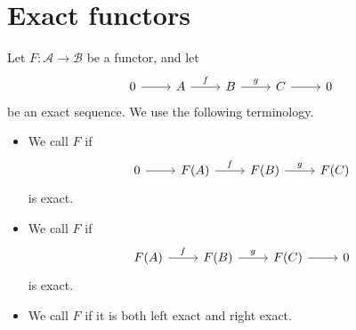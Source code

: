 \documentclass[main.tex]{subfiles}
\begin{document}
\section{Exact functors}
\label{sec:exact_functors}

\begin{definition}
  \label{def:exact_functor}
  Let $F\colon \mathcal{A} \to \mathcal{B}$ be a functor, and let
  \begin{equation*}
    \begin{tikzcd}
      0
      \arrow[r]
      & A
      \arrow[r, "f"]
      & B
      \arrow[r, "g"]
      & C
      \arrow[r]
      & 0
    \end{tikzcd}
  \end{equation*}
  be an exact sequence. We use the following terminology.
  \begin{itemize}
    \item We call $F$  if
      \begin{equation*}
        \begin{tikzcd}
          0
          \arrow[r]
          & F(A)
          \arrow[r, "f"]
          & F(B)
          \arrow[r, "g"]
          & F(C)
        \end{tikzcd}
      \end{equation*}
      is exact.

    \item We call $F$  if
      \begin{equation*}
        \begin{tikzcd}
          F(A)
          \arrow[r, "f"]
          & F(B)
          \arrow[r, "g"]
          & F(C)
          \arrow[r]
          & 0
        \end{tikzcd}
      \end{equation*}
      is exact.

    \item We call $F$  if it is both left exact and right exact.
  \end{itemize}
\end{definition}
\end{document}
